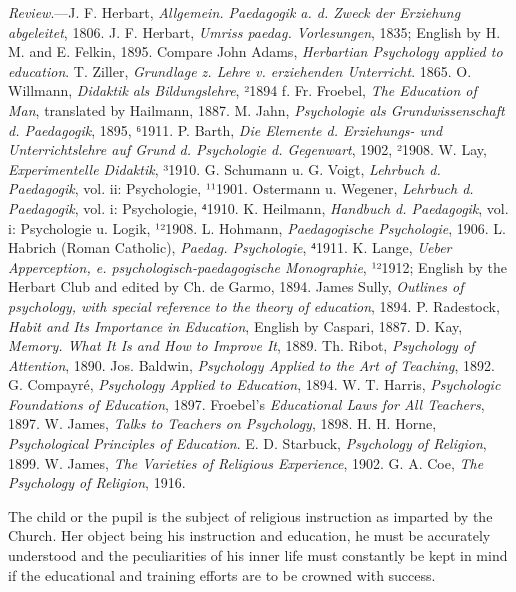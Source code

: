 \emph{Review}.—J. F. Herbart, \emph{Allgemein. Paedagogik a. d. Zweck der Erziehung abgeleitet}, 1806. J. F. Herbart, \emph{Umriss paedag. Vorlesungen}, 1835; English by H. M. and E. Felkin, 1895. Compare John Adams, \emph{Herbartian Psychology applied to education}. T. Ziller, \emph{Grundlage z. Lehre v. erziehenden Unterricht}. 1865. O. Willmann, \emph{Didaktik als Bildungslehre}, ²1894 f. Fr. Froebel, \emph{The Education of Man}, translated by Hailmann, 1887. M. Jahn, \emph{Psychologie als Grundwissenschaft d. Paedagogik}, 1895, ⁶1911. P. Barth, \emph{Die Elemente d. Erziehungs- und Unterrichtslehre auf Grund d. Psychologie d. Gegenwart}, 1902, ²1908. W. Lay, \emph{Experimentelle Didaktik}, ³1910. G. Schumann u. G. Voigt, \emph{Lehrbuch d. Paedagogik}, vol. ii: Psychologie, ¹¹1901. Ostermann u. Wegener, \emph{Lehrbuch d. Paedagogik}, vol. i: Psychologie, ⁴1910. K. Heilmann, \emph{Handbuch d. Paedagogik}, vol. i: Psychologie u. Logik, ¹²1908. L. Hohmann, \emph{Paedagogische Psychologie}, 1906. L. Habrich (Roman Catholic), \emph{Paedag. Psychologie}, ⁴1911. K. Lange, \emph{Ueber Apperception, e. psychologisch-paedagogische Monographie}, ¹²1912; English by the Herbart Club and edited by Ch. de Garmo, 1894. James Sully, \emph{Outlines of psychology, with special reference to the theory of education}, 1894. P. Radestock, \emph{Habit and Its Importance in Education}, English by Caspari, 1887. D. Kay, \emph{Memory. What It Is and How to Improve It}, 1889. Th. Ribot, \emph{Psychology of Attention}, 1890. Jos. Baldwin, \emph{Psychology Applied to the Art of Teaching}, 1892. G. Compayré, \emph{Psychology Applied to Education}, 1894. W. T. Harris, \emph{Psychologic Foundations of Education}, 1897. Froebel’s \emph{Educational Laws for All Teachers}, 1897. W. James, \emph{Talks to Teachers on Psychology}, 1898. H. H. Horne, \emph{Psychological Principles of Education}. E. D. Starbuck, \emph{Psychology of Religion}, 1899. W. James, \emph{The Varieties of Religious Experience}, 1902. G. A. Coe, \emph{The \emph{Psychology of Religion}}, 1916.

The child or the pupil is the subject of religious instruction as imparted by the Church. Her object being his instruction and education, he must be accurately understood and the peculiarities of his inner life must constantly be kept in mind if the educational and training efforts are to be crowned with success.

